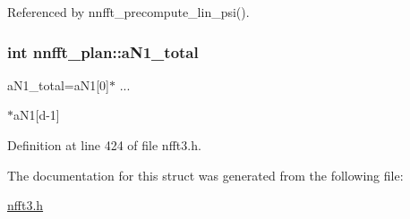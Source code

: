 Referenced by nnfft\-\_\-precompute\-\_\-lin\-\_\-psi().

\hypertarget{structnnfft__plan_acb1a1fa5fdb73d2187e9e9d8e4415921}{
\subsubsection[{a\-N1\-\_\-total}]{\setlength{\rightskip}{0pt plus 5cm}int nnfft\-\_\-plan\-::a\-N1\-\_\-total}}\label{structnnfft__plan_acb1a1fa5fdb73d2187e9e9d8e4415921}


a\-N1\-\_\-total=a\-N1\mbox{[}0\mbox{]}$\ast$ ... 

$\ast$a\-N1\mbox{[}d-\/1\mbox{]} 

Definition at line 424 of file nfft3.\-h.



The documentation for this struct was generated from the following file\-:\begin{DoxyCompactItemize}
\item 
\hyperlink{nfft3_8h}{nfft3.\-h}\end{DoxyCompactItemize}
